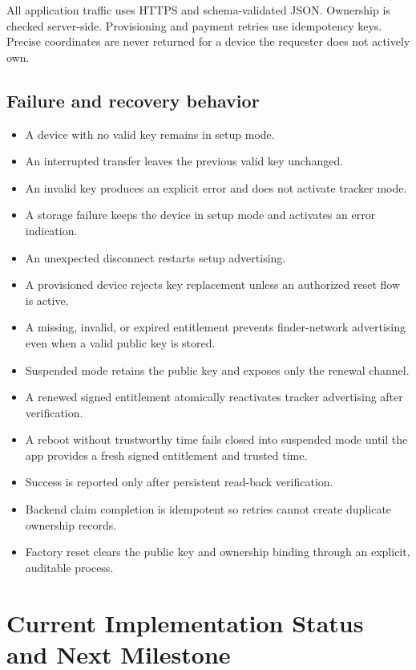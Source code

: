 \documentclass[12pt,a4paper]{article}
\begin{document}
All application traffic uses HTTPS and schema-validated JSON. Ownership is
checked server-side. Provisioning and payment retries use idempotency keys.
Precise coordinates are never returned for a device the requester does not
actively own.

\subsection{Failure and recovery behavior}

\begin{itemize}
    \item A device with no valid key remains in setup mode.
    \item An interrupted transfer leaves the previous valid key unchanged.
    \item An invalid key produces an explicit error and does not activate
    tracker mode.
    \item A storage failure keeps the device in setup mode and activates an
    error indication.
    \item An unexpected disconnect restarts setup advertising.
    \item A provisioned device rejects key replacement unless an authorized
    reset flow is active.
    \item A missing, invalid, or expired entitlement prevents finder-network
    advertising even when a valid public key is stored.
    \item Suspended mode retains the public key and exposes only the renewal
    channel.
    \item A renewed signed entitlement atomically reactivates tracker
    advertising after verification.
    \item A reboot without trustworthy time fails closed into suspended mode
    until the app provides a fresh signed entitlement and trusted time.
    \item Success is reported only after persistent read-back verification.
    \item Backend claim completion is idempotent so retries cannot create
    duplicate ownership records.
    \item Factory reset clears the public key and ownership binding through an
    explicit, auditable process.
\end{itemize}

\section{Current Implementation Status and Next Milestone}
\end{document}
